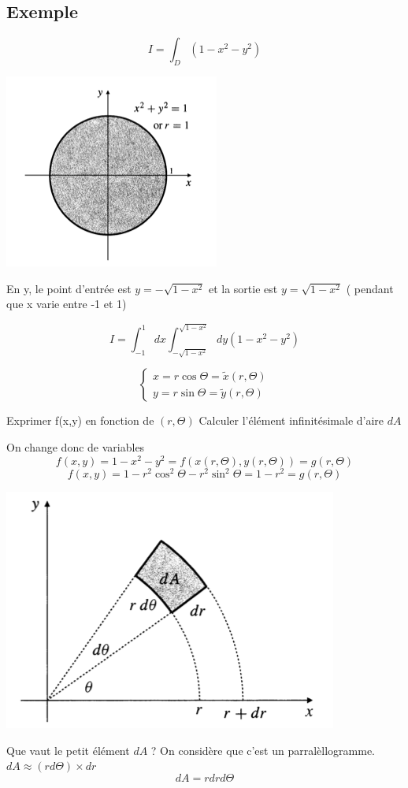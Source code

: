 \subsection{Exemple}
\[I=\int_D (1-x^2-y^2)\]
\begin{center}
\includegraphics[scale=0.7]{image5.png}
\end{center}

 En y, le point d'entrée est $y=-\sqrt{1-x^2}$ et la sortie est  $y=\sqrt{1-x^2}$ ( pendant que x varie entre -1 et 1)

 \[I=\int_{-1}^1 dx \int_{-\sqrt{1-x^2}}^{\sqrt{1-x^2}} dy(1-x^2-y^2) \]

 \begin{myrem}
 $$\left\{
 \begin{array}{r}
 x=r\cos\Theta = \tilde{x}(r,\Theta)\\
 y=r \sin \Theta = \tilde{y}(r,\Theta)
 \end{array}
 \right.
 $$

 Exprimer f(x,y) en fonction de $(r,\Theta)$
 Calculer l'élément infinitésimale d'aire $dA$
 \end{myrem}

 On change donc de variables
 \[f(x,y)=1-x^2-y^2=f(x(r,\Theta),y(r,\Theta)) = g(r,\Theta)\]
 \[f(x,y) = 1-r^2\cos^2\Theta -r^2\sin^2\Theta = 1-r^2 = g(r,\Theta)\]
 \begin{center}

 \includegraphics[scale=0.7]{image6.png}\\

 \end{center}
 Que vaut le petit élément $dA$ ? On considère que c'est un parralèllogramme.
 $dA\approx (rd\Theta)\times dr$
 \[dA = r dr d\Theta\]


